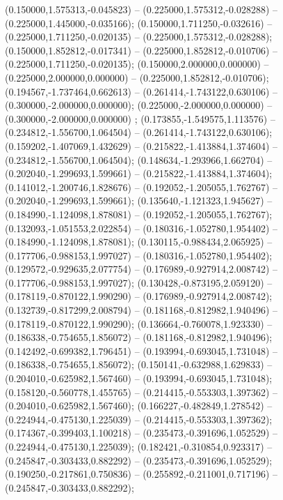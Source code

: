  (0.150000,1.575313,-0.045823) -- (0.225000,1.575312,-0.028288) -- (0.225000,1.445000,-0.035166);
 (0.150000,1.711250,-0.032616) -- (0.225000,1.711250,-0.020135) -- (0.225000,1.575312,-0.028288);
 (0.150000,1.852812,-0.017341) -- (0.225000,1.852812,-0.010706) -- (0.225000,1.711250,-0.020135);
 (0.150000,2.000000,0.000000) -- (0.225000,2.000000,0.000000) -- (0.225000,1.852812,-0.010706);
 (0.194567,-1.737464,0.662613) -- (0.261414,-1.743122,0.630106) -- (0.300000,-2.000000,0.000000);
 (0.225000,-2.000000,0.000000) -- (0.300000,-2.000000,0.000000) ;
 (0.173855,-1.549575,1.113576) -- (0.234812,-1.556700,1.064504) -- (0.261414,-1.743122,0.630106);
 (0.159202,-1.407069,1.432629) -- (0.215822,-1.413884,1.374604) -- (0.234812,-1.556700,1.064504);
 (0.148634,-1.293966,1.662704) -- (0.202040,-1.299693,1.599661) -- (0.215822,-1.413884,1.374604);
 (0.141012,-1.200746,1.828676) -- (0.192052,-1.205055,1.762767) -- (0.202040,-1.299693,1.599661);
 (0.135640,-1.121323,1.945627) -- (0.184990,-1.124098,1.878081) -- (0.192052,-1.205055,1.762767);
 (0.132093,-1.051553,2.022854) -- (0.180316,-1.052780,1.954402) -- (0.184990,-1.124098,1.878081);
 (0.130115,-0.988434,2.065925) -- (0.177706,-0.988153,1.997027) -- (0.180316,-1.052780,1.954402);
 (0.129572,-0.929635,2.077754) -- (0.176989,-0.927914,2.008742) -- (0.177706,-0.988153,1.997027);
 (0.130428,-0.873195,2.059120) -- (0.178119,-0.870122,1.990290) -- (0.176989,-0.927914,2.008742);
 (0.132739,-0.817299,2.008794) -- (0.181168,-0.812982,1.940496) -- (0.178119,-0.870122,1.990290);
 (0.136664,-0.760078,1.923330) -- (0.186338,-0.754655,1.856072) -- (0.181168,-0.812982,1.940496);
 (0.142492,-0.699382,1.796451) -- (0.193994,-0.693045,1.731048) -- (0.186338,-0.754655,1.856072);
 (0.150141,-0.632988,1.629833) -- (0.204010,-0.625982,1.567460) -- (0.193994,-0.693045,1.731048);
 (0.158120,-0.560778,1.455765) -- (0.214415,-0.553303,1.397362) -- (0.204010,-0.625982,1.567460);
 (0.166227,-0.482849,1.278542) -- (0.224944,-0.475130,1.225039) -- (0.214415,-0.553303,1.397362);
 (0.174367,-0.399403,1.100218) -- (0.235473,-0.391696,1.052529) -- (0.224944,-0.475130,1.225039);
 (0.182421,-0.310854,0.923317) -- (0.245847,-0.303433,0.882292) -- (0.235473,-0.391696,1.052529);
 (0.190250,-0.217861,0.750836) -- (0.255892,-0.211001,0.717196) -- (0.245847,-0.303433,0.882292);
